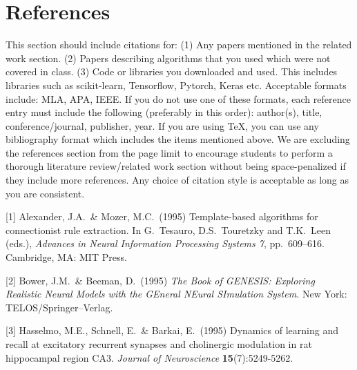 \documentclass{article}
\begin{document}
\section*{References}
This section should include citations for: (1) Any papers mentioned in the related work
section. (2) Papers describing algorithms that you used which were not covered in class.
(3) Code or libraries you downloaded and used. This includes libraries such as scikit-learn, Tensorflow, Pytorch, Keras etc. Acceptable formats include: MLA, APA, IEEE. If you
do not use one of these formats, each reference entry must include the following (preferably
in this order): author(s), title, conference/journal, publisher, year. If you are using TeX,
you can use any bibliography format which includes the items mentioned above. We are excluding
the references section from the page limit to encourage students to perform a thorough
literature review/related work section without being space-penalized if they include more
references. Any choice of citation style is acceptable
as long as you are consistent. 

\medskip
\small
[1] Alexander, J.A.\ \& Mozer, M.C.\ (1995) Template-based algorithms
for connectionist rule extraction. In G.\ Tesauro, D.S.\ Touretzky and
T.K.\ Leen (eds.), {\it Advances in Neural Information Processing
  Systems 7}, pp.\ 609--616. Cambridge, MA: MIT Press.

[2] Bower, J.M.\ \& Beeman, D.\ (1995) {\it The Book of GENESIS:
  Exploring Realistic Neural Models with the GEneral NEural SImulation
  System.}  New York: TELOS/Springer--Verlag.

[3] Hasselmo, M.E., Schnell, E.\ \& Barkai, E.\ (1995) Dynamics of
learning and recall at excitatory recurrent synapses and cholinergic
modulation in rat hippocampal region CA3. {\it Journal of
  Neuroscience} {\bf 15}(7):5249-5262.
\end{document}
